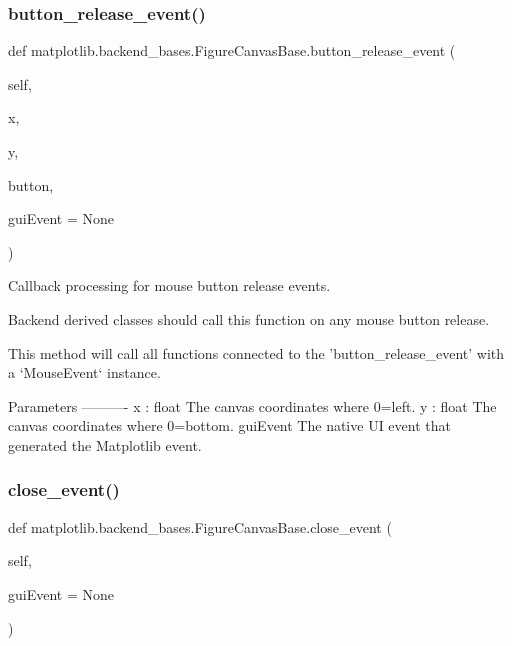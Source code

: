 \subsubsection{\texorpdfstring{button\+\_\+release\+\_\+event()}{button\_release\_event()}}
{\footnotesize\ttfamily def matplotlib.\+backend\+\_\+bases.\+Figure\+Canvas\+Base.\+button\+\_\+release\+\_\+event (\begin{DoxyParamCaption}\item[{}]{self,  }\item[{}]{x,  }\item[{}]{y,  }\item[{}]{button,  }\item[{}]{gui\+Event = {\ttfamily None} }\end{DoxyParamCaption})}

\begin{DoxyVerb}Callback processing for mouse button release events.

Backend derived classes should call this function on any mouse
button release.

This method will call all functions connected to the
'button_release_event' with a `MouseEvent` instance.

Parameters
----------
x : float
    The canvas coordinates where 0=left.
y : float
    The canvas coordinates where 0=bottom.
guiEvent
    The native UI event that generated the Matplotlib event.
\end{DoxyVerb}
 \mbox{\label{classmatplotlib_1_1backend__bases_1_1FigureCanvasBase_a6170cc3bfe641e6857c0fa4e956cd419}} 
\subsubsection{\texorpdfstring{close\+\_\+event()}{close\_event()}}
{\footnotesize\ttfamily def matplotlib.\+backend\+\_\+bases.\+Figure\+Canvas\+Base.\+close\+\_\+event (\begin{DoxyParamCaption}\item[{}]{self,  }\item[{}]{gui\+Event = {\ttfamily None} }\end{DoxyParamCaption})}

